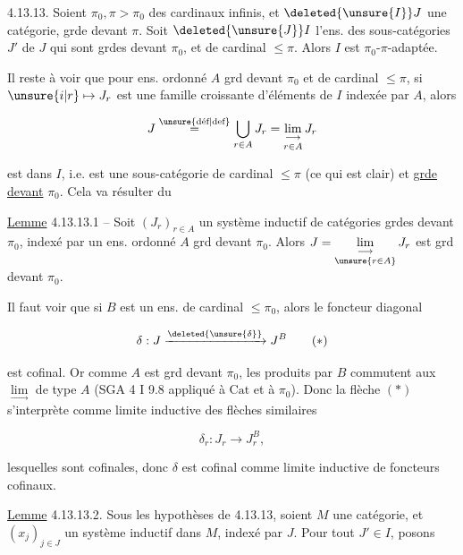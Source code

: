 
 4.13.13. Soient $\pi_0,\pi>\pi_0$ des cardinaux infinis,  et $\deleted{\unsure{I}}J$ une  catégorie, grde devant $\pi$. Soit $\deleted{\unsure{J}}I$ l'ens. des sous-catégories $J'$ de $J$  qui sont grdes devant $\pi_0$, et de cardinal $\leq\pi$. Alors $I$ est $\pi_0$-$\pi$-adaptée.

Il reste à voir que pour  ens. ordonné $A$ grd devant $\pi_0$ et de cardinal $\leq\pi$, si $\unsure{i|r}\mapsto J_r$ est une famille croissante d'éléments de $I$ indexée par $A$, alors

\[
J\overset{\text{\unsure{déf|def}}}{=}\bigcup_{r\in A}J_r=\underset{r\in A}{\underset{\longrightarrow}{\lim}}\,J_r
\]

est dans $I$, i.e. est une sous-catégorie  de cardinal $\leq\pi$ (ce qui est clair) et \uline{grde devant} $\pi_0$. Cela va résulter du

\uline{Lemme} 4.13.13.1 -- Soit $(J_r)_{r\in A}$ un système inductif de catégories grdes devant $\pi_0$, indexé par un ens. ordonné $A$ grd devant $\pi_0$. Alors $J=\underset{\unsure{r\in A}}{\underset{\longrightarrow}{\lim}}\,J_r$ est grd devant $\pi_0$.


Il faut voir que si $B$ est un ens. de cardinal $\leq\pi_0$, alors le foncteur diagonal

\[
\delta:J\xrightarrow{\deleted{\unsure{\delta}}}J^B \tag*{$(*)$}
\]

est cofinal. Or comme $A$ est grd devant $\pi_0$,  les produits  par $B$ commutent aux $\underset{\longrightarrow}{\lim}$ de type $A$ (SGA 4 I 9.8 appliqué à $\mathrm{Cat}$ et à $\pi_0$). Donc la flèche $(*)$  s'interprète comme limite inductive des flèches similaires

\[
\delta_r:J_r\longrightarrow J_r^B, \tag*{$(**)$}
\]

lesquelles sont cofinales, donc $\delta$ est cofinal comme limite inductive de foncteurs cofinaux.

\uline{Lemme} 4.13.13.2. Sous les hypothèses de 4.13.13, soient $M$ une catégorie, et $(x_j)_{j\in J}$  un système inductif  dans $M$, indexé par $J$. Pour tout $J'\in I$, posons

